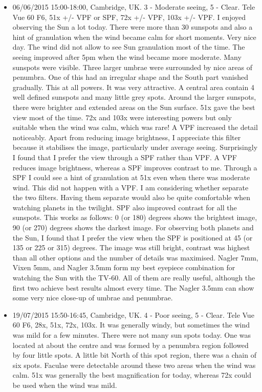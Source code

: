 \begin{itemize}
\item 06/06/2015 15:00-18:00, Cambridge, UK. 3 - Moderate seeing, 5 - Clear. Tele Vue 60 F6, 51x +/- VPF or SPF, 72x +/- VPF, 103x +/- VPF. I enjoyed observing the Sun a lot today. There were more than 30 sunspots and also a hint of granulation when the wind became calm for short moments. Very nice day. The wind did not allow to see Sun granulation most of the time. The seeing improved after 5pm when the wind became more moderate. Many sunspots were visible. Three larger umbrae were surrounded by nice areas of penumbra. One of this had an irregular shape and the South part vanished gradually. This at all powers. It was very attractive. A central area contain 4 well defined sunspots and many little grey spots. Around the larger sunspots, there were brighter and extended areas on the Sun surface. 51x gave the best view most of the time. 72x and 103x were interesting powers but only suitable when the wind was calm, which was rare! A VPF increased the detail noticeably. Apart from reducing image brightness, I appreciate this filter because it stabilises the image, particularly under average seeing. Surprisingly I found that I prefer the view through a SPF rather than VPF. A VPF reduces image brightness, whereas a SPF improves contrast to me. Through a SPF I could see a hint of granulation at 51x even when there was moderate wind. This did not happen with a VPF. I am considering whether separate the two filters. Having them separate would also be quite comfortable when watching planets in the twilight. SPF also improved contrast for all the sunspots. This works as follows: 0 (or 180) degrees shows the brightest image, 90 (or 270) degrees shows the darkest image. For observing both planets and the Sun, I found that I prefer the view when the SPF is positioned at 45 (or 135 or 225 or 315) degrees. The image was still bright, contrast was highest than all other options and the number of details was maximised. Nagler 7mm, Vixen 5mm, and Nagler 3.5mm form my best eyepiece combination for watching the Sun with the TV-60. All of them are really useful, although the first two achieve best results almost every time. The Nagler 3.5mm can show some very nice close-up of umbrae and penumbrae.
\item 19/07/2015 15:50-16:45, Cambridge, UK. 4 - Poor seeing, 5 - Clear. Tele Vue 60 F6, 28x, 51x, 72x, 103x. It was generally windy, but sometimes the wind was mild for a few minutes. There were not many sun spots today. One was located at about the centre and was formed by a penumbra region followed by four little spots. A little bit North of this spot region, there was a chain of six spots. Faculae were detectable around these two areas when the wind was calm. 51x was generally the best magnification for today, whereas 72x could be used when the wind was mild.
\end{itemize}
